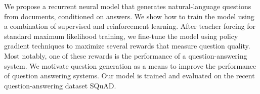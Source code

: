 We propose a recurrent neural model that generates natural-language questions from documents, conditioned on answers. We show how to train the model using a combination of supervised and reinforcement learning. After teacher forcing for standard maximum likelihood training, we fine-tune the model using policy gradient techniques to maximize several rewards that measure question quality. Most notably, one of these rewards is the performance of a question-answering system. We motivate question generation as a means to improve the performance of question answering systems. Our model is trained and evaluated on the recent question-answering dataset SQuAD.
